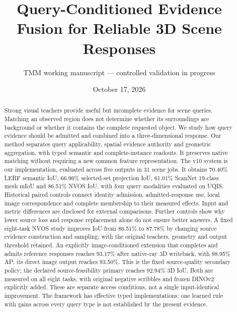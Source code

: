 \documentclass[10pt]{article}
\title{Query-Conditioned Evidence Fusion for Reliable 3D Scene Responses}
\author{TMM working manuscript --- controlled validation in progress}
\date{October 17, 2026}
\begin{document}
\maketitle
\begin{abstract}
Strong visual teachers provide useful but incomplete evidence for scene queries.
Matching an observed region does not determine whether its surroundings are
background or whether it contains the complete requested object. We study how
query evidence should be admitted and combined into a three-dimensional response.
Our method separates query applicability, spatial evidence authority and
geometric aggregation, with typed semantic and complete-instance readouts. It
preserves native matching without requiring a new common feature representation.
The v10 system is our implementation, evaluated across five outputs in 31 scene
jobs. It obtains 70.40\% LERF semantic IoU, 66.96\% selected-set projection IoU,
61.01\% ScanNet 19-class mesh mIoU and 86.51\% NVOS IoU, with four query modalities
evaluated on UQIS. Historical paired controls connect identity admission,
admitted-response use, local image correspondence and complete membership to
their measured effects. Input and metric differences are disclosed for external
comparisons. Further controls show why lower source loss and response replacement
alone do not ensure better answers. A fixed eight-task NVOS study improves IoU
from 86.51\% to 87.78\% by changing source evidence construction and sampling,
with the original teachers, geometry and output threshold retained. An explicitly
image-conditioned extension that completes and admits reference responses reaches
93.17\% after native-ray 3D writeback, with 98.95\% AP; its direct image output
reaches 93.50\%. This is the fixed source-quality secondary policy; the declared
source-feasibility primary reaches 92.94\% 3D IoU. Both are measured on all eight
tasks, with original negative scribbles and frozen DINOv2 explicitly added.
These are separate access
conditions, not a single input-identical improvement. The framework has effective typed
implementations; one learned rule with gains across every query type is not
established by the present evidence.
\end{abstract}






\end{document}
